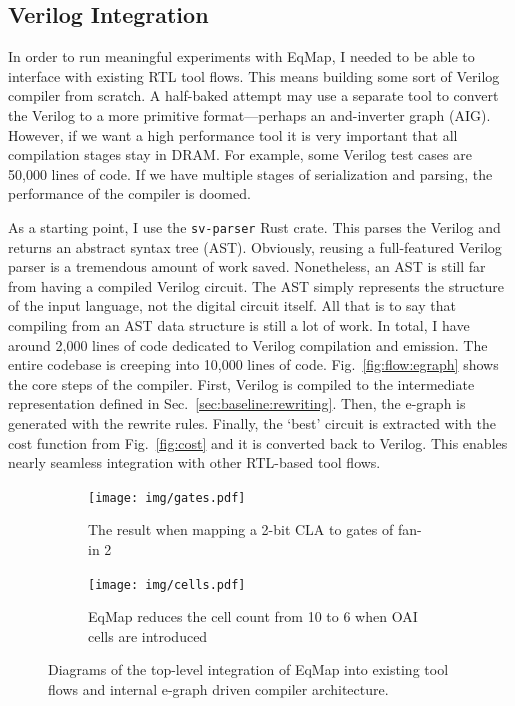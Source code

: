 \documentclass[10pt,letterpaper]{article}
\newcommand{\shortname}{EqMap}
\begin{document}
\subsection{Verilog Integration}\label{sec:baseline:backend}

In order to run meaningful experiments with \shortname{}, I needed to be able
to interface with existing RTL tool flows. This means building some sort of
Verilog compiler from scratch. A half-baked attempt may use a separate tool to
convert the Verilog to a more primitive format---perhaps an and-inverter graph
(AIG). However, if we want a high performance tool it is very important that
all compilation stages stay in DRAM. For example, some Verilog test cases are
50,000 lines of code. If we have multiple stages of serialization and parsing,
the performance of the compiler is doomed.

As a starting point, I use the \texttt{sv-parser} Rust crate. This parses the
Verilog and returns an abstract syntax tree (AST). Obviously, reusing a
full-featured Verilog parser is a tremendous amount of work saved. Nonetheless,
an AST is still far from having a compiled Verilog circuit. The AST simply
represents the structure of the input language, not the digital circuit itself.
All that is to say that compiling from an AST data structure is still a lot of
work. In total, I have around 2,000 lines of code dedicated to Verilog
compilation and emission. The entire codebase is creeping into 10,000 lines of
code. Fig.~\ref{fig:flow:egraph} shows the core steps of the compiler. First,
Verilog is compiled to the intermediate representation defined in
Sec.~\ref{sec:baseline:rewriting}. Then, the e-graph is generated with the
rewrite rules. Finally, the `best' circuit is extracted with the cost function
from Fig.~\ref{fig:cost} and it is converted back to Verilog. This enables
nearly seamless integration with other RTL-based tool flows.

\begin{figure}[h]
    \begin{subfigure}{\textwidth}
        \centering
        \texttt{[image: img/gates.pdf]}
        \caption{The result when mapping a 2-bit CLA to gates of fan-in 2}\label{fig:test:gates}
    \end{subfigure}\vspace{0.5cm}
    \begin{subfigure}{\textwidth}
        \centering
        \texttt{[image: img/cells.pdf]}
        \caption{EqMap reduces the cell count from 10 to 6 when OAI cells are introduced}\label{fig:test:cells}
    \end{subfigure}
    \caption{Diagrams of the top-level integration of \shortname{} into existing tool flows and internal e-graph driven compiler architecture.}\label{fig:flow}
\end{figure}
\end{document}
